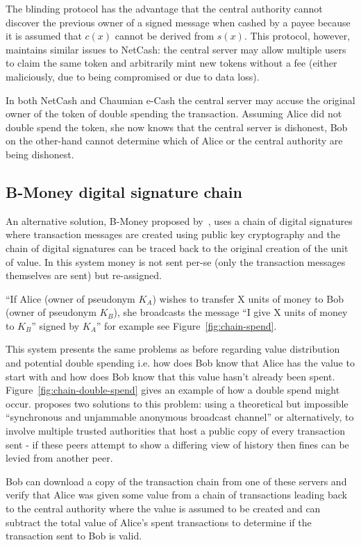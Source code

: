 The blinding protocol has the advantage that the central authority cannot discover the previous owner of a signed message when cashed by a payee because it is assumed that $c(x)$ cannot be derived from $s(x)$.  This protocol, however, maintains similar issues to NetCash: the central server may allow multiple users to claim the same token and arbitrarily mint new tokens without a fee (either maliciously, due to being compromised or due to data loss).

In both NetCash and Chaumian e-Cash the central server may accuse the original owner of the token of double spending the transaction.  Assuming Alice did not double spend the token, she now knows that the central server is dishonest, Bob on the other-hand cannot determine which of Alice or the central authority are being dishonest.

\subsection{B-Money digital signature chain}\label{digital-sig}
An alternative solution, B-Money proposed by~\textcite{b-money}, uses a chain of digital signatures where transaction messages are created using public key cryptography and the chain of digital signatures can be traced back to the original creation of the unit of value. In this system money is not sent per-se (only the transaction messages themselves are sent) but re-assigned.

``If Alice (owner of pseudonym $K_A$) wishes to transfer X units of money to Bob (owner of pseudonym $K_B$), she broadcasts the message ``I give X units of money to $K_B$'' signed by $K_A$'' for example see Figure~\ref{fig:chain-spend}.

This system presents the same problems as before regarding value distribution and potential double spending i.e. how does Bob know that Alice has the value to start with and how does Bob know that this value hasn't already been spent.  Figure~\ref{fig:chain-double-spend} gives an example of how a double spend might occur. \textcite{b-money} proposes two solutions to this problem: using a theoretical but impossible ``synchronous and unjammable anonymous broadcast channel'' or alternatively, to involve multiple trusted authorities that host a public copy of every transaction sent - if these peers attempt to show a differing view of history then fines can be levied from another peer.

Bob can download a copy of the transaction chain from one of these servers and verify that Alice was given some value from a chain of transactions leading back to the central authority where the value is assumed to be created and can subtract the total value of  Alice's spent transactions to determine if the transaction sent to Bob is valid.

